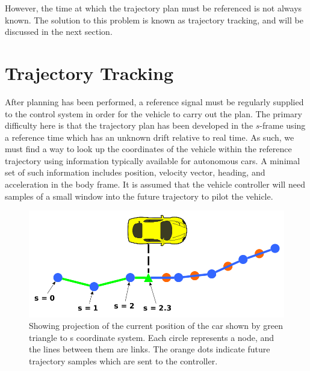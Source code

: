 \documentclass[letterpaper, 10 pt, conference]{ieeeconf}  %
\begin{document}

However, the time at which the trajectory plan must be referenced is not always known.
The solution to this problem is known as trajectory tracking, and will be discussed in the next section.



\section{Trajectory Tracking} \label{sec:trajectorytracking}

After planning has been performed, a reference signal must be regularly supplied to the control system in order for the vehicle to carry out the plan.
The primary difficulty here is that the trajectory plan has been developed in the $s$-frame using a reference time which has an unknown drift relative to real time.
As such, we must find a way to look up the coordinates of the vehicle within the reference trajectory using information typically available for autonomous cars.
A minimal set of such information includes position, velocity vector, heading, and acceleration in the body frame.
It is assumed that the vehicle controller will need samples of a small window into the future trajectory to pilot the vehicle.

\begin{figure}[thpb]
  \centering
  \includegraphics[width=0.8\columnwidth]{graphics/PathProjectionSlice.png}
  \caption{Showing projection of the current position of the car shown by green triangle to s coordinate system. Each circle represents a node, and the lines between them are links. The orange dots indicate future trajectory samples which are sent to the controller.
  }

  \label{fig:cartos}
\end{figure}
\end{document}
